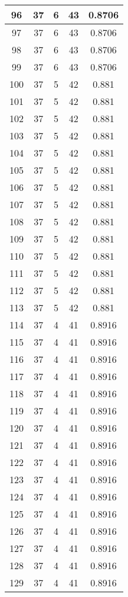 \documentclass[letterpaper, 12pt]{article}
\begin{document}
\begin{longtable}{|c|c|c|c|c|}
\hline
96 & 37 & 6 & 43 & 0.8706 \\
\hline
97 & 37 & 6 & 43 & 0.8706 \\
\hline
98 & 37 & 6 & 43 & 0.8706 \\
\hline
99 & 37 & 6 & 43 & 0.8706 \\
\hline
100 & 37 & 5 & 42 & 0.881 \\
\hline
101 & 37 & 5 & 42 & 0.881 \\
\hline
102 & 37 & 5 & 42 & 0.881 \\
\hline
103 & 37 & 5 & 42 & 0.881 \\
\hline
104 & 37 & 5 & 42 & 0.881 \\
\hline
105 & 37 & 5 & 42 & 0.881 \\
\hline
106 & 37 & 5 & 42 & 0.881 \\
\hline
107 & 37 & 5 & 42 & 0.881 \\
\hline
108 & 37 & 5 & 42 & 0.881 \\
\hline
109 & 37 & 5 & 42 & 0.881 \\
\hline
110 & 37 & 5 & 42 & 0.881 \\
\hline
111 & 37 & 5 & 42 & 0.881 \\
\hline
112 & 37 & 5 & 42 & 0.881 \\
\hline
113 & 37 & 5 & 42 & 0.881 \\
\hline
114 & 37 & 4 & 41 & 0.8916 \\
\hline
115 & 37 & 4 & 41 & 0.8916 \\
\hline
116 & 37 & 4 & 41 & 0.8916 \\
\hline
117 & 37 & 4 & 41 & 0.8916 \\
\hline
118 & 37 & 4 & 41 & 0.8916 \\
\hline
119 & 37 & 4 & 41 & 0.8916 \\
\hline
120 & 37 & 4 & 41 & 0.8916 \\
\hline
121 & 37 & 4 & 41 & 0.8916 \\
\hline
122 & 37 & 4 & 41 & 0.8916 \\
\hline
123 & 37 & 4 & 41 & 0.8916 \\
\hline
124 & 37 & 4 & 41 & 0.8916 \\
\hline
125 & 37 & 4 & 41 & 0.8916 \\
\hline
126 & 37 & 4 & 41 & 0.8916 \\
\hline
127 & 37 & 4 & 41 & 0.8916 \\
\hline
128 & 37 & 4 & 41 & 0.8916 \\
\hline
129 & 37 & 4 & 41 & 0.8916 \\

\end{longtable}
\end{document}

